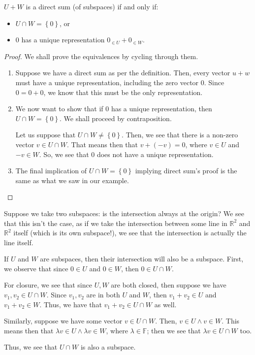 \documentclass[openany]{book}
\newcommand{\RR}{\mathbb{R}}
\begin{document}
	\begin{thm}
		$U + W$ is a direct sum (of subspaces) if and only if:
		\begin{itemize}
			\item $U \cap W = \left\{  0\right\}$, or
			\item $0$ has a unique representation $0_{\in U} + 0_{\in W}$.
		\end{itemize}
	\end{thm}
	\begin{proof}
		We shall prove the equivalences by cycling through them.
		
		\begin{enumerate}
			\item Suppose we have a direct sum as per the definition. Then, every vector $u + w$ must have a unique representation, including the zero vector $0$. Since $0 = 0 + 0$, we know that this must be the only representation.
			
			\item We now want to show that if $0$ has a unique representation, then $U \cap W = \left\{  0\right\}$. We shall proceed by contraposition.
			
			Let us suppose that $U \cap W \not= \left\{  0 \right\}$. Then, we see that there is a non-zero vector $v \in U \cap W$. That means then that $v + (-v) = 0$, where $v \in U$ and $-v \in W$. So, we see that $0$ does not have a unique representation.
			
			\item The final implication of $U \cap W = \left\{  0\right\}$ implying direct sum's proof is the same as what we saw in our example.
		\end{enumerate}
	\end{proof}
	
	\begin{rmk}
		Suppose we take two subspaces: is the intersection always at the origin? We see that this isn't the case, as if we take the intersection between some line in $\RR^{2}$ and $\RR^{2}$ itself (which is its own subspace!), we see that the intersection is actually the line itself.
	\end{rmk}
	
	\begin{rmk}
		If $U$ and $W$ are subspaces, then their intersection will also be a subspace. First, we observe that since $0 \in U$ and $0 \in W$, then $0 \in U \cap W$.
		
		For closure, we see that since $U, W$ are both closed, then suppose we have $v_{1}, v_{2} \in U \cap W$. Since $v_{1}, v_{2}$ are in both $U$ and $W$, then $v_{1} + v_{2} \in U$ and $v_{1} + v_{2} \in W$. Thus, we have that $v_{1} + v_{2} \in U \cap W$ as well.
		
		Similarly, suppose we have some vector $v \in U \cap W$. Then, $v \in U \land v \in W$. This means then that $\lambda v \in U \land \lambda v \in W$, where $\lambda \in \mathbb{F}$; then we see that $\lambda v \in U \cap W$ too.
		
		Thus, we see that $U \cap W$ is also a subspace.
	\end{rmk}
	
\end{document}
